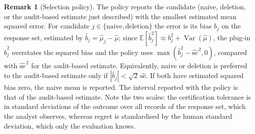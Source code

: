 \documentclass[11pt]{article}
\theoremstyle{definition}
\newtheorem{remark}{Remark}
\newcommand{\E}{\mathbb{E}}
\newcommand{\Var}{\operatorname{Var}}
\begin{document}
\begin{remark}[Selection policy]\label{r:policy}
The policy reports the candidate (naive, deletion, or the audit-based estimate just
described) with the smallest estimated mean squared error. For candidate
$j\in\{\text{naive},\text{deletion}\}$ the error is its bias $b_j$ on the response set,
estimated by $\hat b_j=\hat\mu_j-\hat\mu$; since $\E[\hat b_j^2]\approx b_j^2+\Var(\hat\mu)$,
the plug-in $\hat b_j^2$ overstates the squared bias and the policy uses
$\max(\hat b_j^2-\widehat{\mathrm{se}}^{\,2},0)$, compared with $\widehat{\mathrm{se}}^{\,2}$
for the audit-based estimate. Equivalently, naive or deletion is preferred to the
audit-based estimate only if $|\hat b_j|<\sqrt2\,\widehat{\mathrm{se}}$. If both have estimated squared bias zero, the naive mean is reported. The interval
reported with the policy is that of the audit-based estimate. Note the two scales: the
certification tolerance is in standard deviations of the outcome over all records of the
response set, which the analyst observes, whereas regret is standardised by the human
standard deviation, which only the evaluation knows.
\end{remark}
\end{document}
